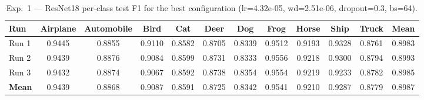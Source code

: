 \begin{table}[H]
\centering
\caption{Exp.\ 1 — ResNet18 per-class test F1 for the best configuration (lr=4.32e-05, wd=2.51e-06, dropout=0.3, bs=64).}
\label{tab:exp1_resnet18_perclass}
\small
\begin{tabular}{lccccccccccc}
\toprule
\textbf{Run} & \textbf{Airplane} & \textbf{Automobile} & \textbf{Bird} & \textbf{Cat} & \textbf{Deer} & \textbf{Dog} & \textbf{Frog} & \textbf{Horse} & \textbf{Ship} & \textbf{Truck} & \textbf{Mean} \\
\midrule
Run 1 & 0.9445 & 0.8855 & 0.9110 & 0.8582 & 0.8705 & 0.8339 & 0.9512 & 0.9193 & 0.9328 & 0.8761 & 0.8983 \\
Run 2 & 0.9439 & 0.8876 & 0.9084 & 0.8599 & 0.8731 & 0.8333 & 0.9556 & 0.9218 & 0.9300 & 0.8794 & 0.8993 \\
Run 3 & 0.9432 & 0.8874 & 0.9067 & 0.8592 & 0.8738 & 0.8354 & 0.9554 & 0.9219 & 0.9233 & 0.8782 & 0.8985 \\
\midrule
\textbf{Mean} & 0.9439 & 0.8868 & 0.9087 & 0.8591 & 0.8725 & 0.8342 & 0.9541 & 0.9210 & 0.9287 & 0.8779 & 0.8987 \\
\bottomrule
\end{tabular}
\end{table}
